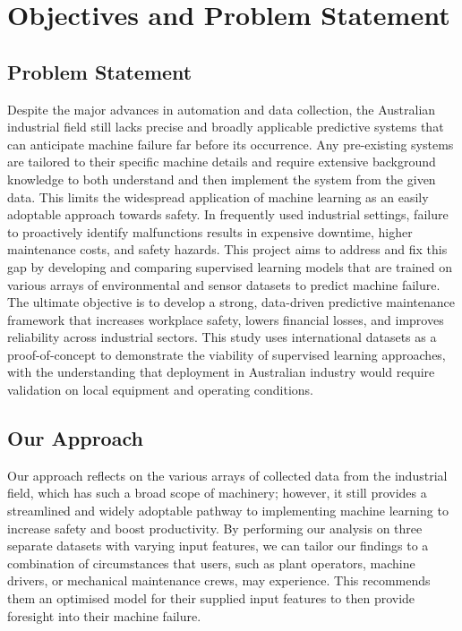 \documentclass[11pt]{article}
\begin{document}
\section {Objectives and Problem Statement}


\subsection{Problem Statement}

Despite the major advances in automation and data collection, the Australian industrial field still lacks precise and broadly applicable predictive systems that can anticipate machine failure far before its occurrence. Any pre-existing systems are tailored to their specific machine details and require extensive background knowledge to both understand and then implement the system from the given data. This limits the widespread application of machine learning as an easily adoptable approach towards safety. In frequently used industrial settings, failure to proactively identify malfunctions results in expensive downtime, higher maintenance costs, and safety hazards. This project aims to address and fix this gap by developing and comparing supervised learning models that are trained on various arrays of environmental and sensor datasets to predict machine failure. The ultimate objective is to develop a strong, data-driven predictive maintenance framework that increases workplace safety, lowers financial losses, and improves reliability across industrial sectors. This study uses international datasets as a proof-of-concept to demonstrate the viability of supervised learning approaches, with the understanding that deployment in Australian industry would require validation on local equipment and operating conditions.

\subsection{Our Approach}

Our approach reflects on the various arrays of collected data from the industrial field, which has such a broad scope of machinery; however, it still provides a streamlined and widely adoptable pathway to implementing machine learning to increase safety and boost productivity. By performing our analysis on three separate datasets with varying input features, we can tailor our findings to a combination of circumstances that users, such as plant operators, machine drivers, or mechanical maintenance crews, may experience. This recommends them an optimised model for their supplied input features to then provide foresight into their machine failure.
\end{document}
